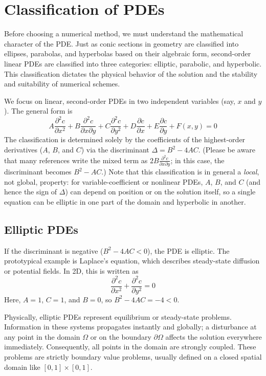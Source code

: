 \section{Classification of PDEs}

Before choosing a numerical method, we must understand the mathematical character of the PDE. Just as conic sections in geometry are classified into ellipses, parabolas, and hyperbolas based on their algebraic form, second-order linear PDEs are classified into three categories: elliptic, parabolic, and hyperbolic. This classification dictates the physical behavior of the solution and the stability and suitability of numerical schemes.

We focus on linear, second-order PDEs in two independent variables (say, $x$ and $y$). The general form is
\begin{equation}
    A \frac{\partial^2 c}{\partial x^2} + B \frac{\partial^2 c}{\partial x \partial y} + C \frac{\partial^2 c}{\partial y^2} + D \frac{\partial c}{\partial x} + E \frac{\partial c}{\partial y} + F(x, y) = 0
\end{equation}
The classification is determined solely by the coefficients of the highest-order derivatives ($A$, $B$, and $C$) via the discriminant $\Delta = B^2 - 4AC$. (Please be aware that many references write the mixed term as $2B \frac{\partial^2 c}{\partial x \partial y}$; in this case, the discriminant becomes $B^2 - AC$.) Note that this classification is in general a \emph{local}, not global, property: for variable-coefficient or nonlinear PDEs, $A$, $B$, and $C$ (and hence the sign of $\Delta$) can depend on position or on the solution itself, so a single equation can be elliptic in one part of the domain and hyperbolic in another.

\subsection{Elliptic PDEs}

If the discriminant is negative ($B^2 - 4AC < 0$), the PDE is elliptic. The prototypical example is Laplace's equation, which describes steady-state diffusion or potential fields. In 2D, this is written as
\begin{equation}
    \frac{\partial^2 c}{\partial x^2} + \frac{\partial^2 c}{\partial y^2} = 0
\end{equation}
Here, $A=1$, $C=1$, and $B=0$, so $B^2 - 4AC = -4 < 0$.

Physically, elliptic PDEs represent equilibrium or steady-state problems. Information in these systems propagates instantly and globally; a disturbance at any point in the domain $\Omega$ or on the boundary $\partial \Omega$ affects the solution everywhere immediately. Consequently, all points in the domain are strongly coupled. These problems are strictly boundary value problems, usually defined on a closed spatial domain like $[0, 1] \times [0, 1]$.

